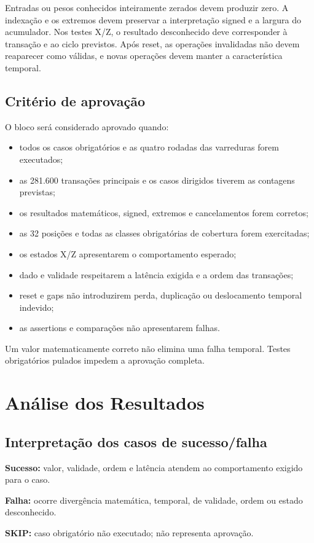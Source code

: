 \documentclass[12pt,a4paper]{article}
\begin{document}
Entradas ou pesos conhecidos inteiramente zerados devem produzir zero. A indexação e os extremos devem preservar a interpretação signed e a largura do acumulador. Nos testes X/Z, o resultado desconhecido deve corresponder à transação e ao ciclo previstos. Após reset, as operações invalidadas não devem reaparecer como válidas, e novas operações devem manter a característica temporal.

\subsection{Critério de aprovação}
O bloco será considerado aprovado quando:
\begin{itemize}
\item todos os casos obrigatórios e as quatro rodadas das varreduras forem executados;
\item as 281.600 transações principais e os casos dirigidos tiverem as contagens previstas;
\item os resultados matemáticos, signed, extremos e cancelamentos forem corretos;
\item as 32 posições e todas as classes obrigatórias de cobertura forem exercitadas;
\item os estados X/Z apresentarem o comportamento esperado;
\item dado e validade respeitarem a latência exigida e a ordem das transações;
\item reset e gaps não introduzirem perda, duplicação ou deslocamento temporal indevido;
\item as assertions e comparações não apresentarem falhas.
\end{itemize}
Um valor matematicamente correto não elimina uma falha temporal. Testes obrigatórios pulados impedem a aprovação completa.

\section{Análise dos Resultados}
\subsection{Interpretação dos casos de sucesso/falha}
\textbf{Sucesso:} valor, validade, ordem e latência atendem ao comportamento exigido para o caso.\par
\textbf{Falha:} ocorre divergência matemática, temporal, de validade, ordem ou estado desconhecido.\par
\textbf{SKIP:} caso obrigatório não executado; não representa aprovação.
\end{document}
